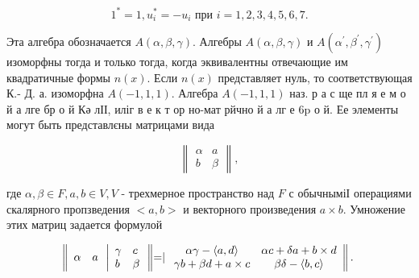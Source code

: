 \documentclass[10pt]{article}
\begin{document}
\[

1^{*}=1, u_{i}^{*}=-u_{i} \text { при } i=1,2,3,4,5,6,7 .

\]



Эта алгебра обозначается $A(\alpha, \beta, \gamma)$. Алгебры $A(\alpha, \beta, \gamma)$ и $A\left(\alpha^{\prime}, \beta^{\prime}, \gamma^{\prime}\right)$ изоморфны тогда и только тогда, когда эквивалентны отвечающие им квадратичные формы $n(x)$. Если $n(x)$ представляет нуль, то соответствующая К.- Д. а. изоморфна $A(-1,1,1)$. Алгебра $A(-1,1,1)$ наз. р а с ще пл я е м о й а лге бр о й Кә лІІ, иліг в е к т ор но-мат рйчно й а лг е $6 \mathrm{p}$ о й. Ее элементы могут быть представлєны матрицами вида



\[

\left\|\begin{array}{ll}

\alpha & a \\

b & \beta

\end{array}\right\|,

\]



где $\alpha, \beta \in F, a, b \in V, V$ - трехмерное пространство над $F$ с обычныміІ операциями скалярного пропзведения $<a, b>$ и векторного произведения $a \times b$. Умножение этих матриц задается формулой



\[

\left\|\begin{array} { l l } 

{ \alpha } & { a }

\end{array} \left|\begin{array}{ll}

\gamma & c \\

b & \beta

\end{array}\left\|=\mid \begin{array}{cc}

\alpha \gamma-\langle a, d\rangle & \alpha c+\delta a+b \times d \\

\gamma b+\beta d+a \times c & \beta \delta-\langle b, c\rangle

\end{array}\right\| .\right.\right.

\]
\end{document}
